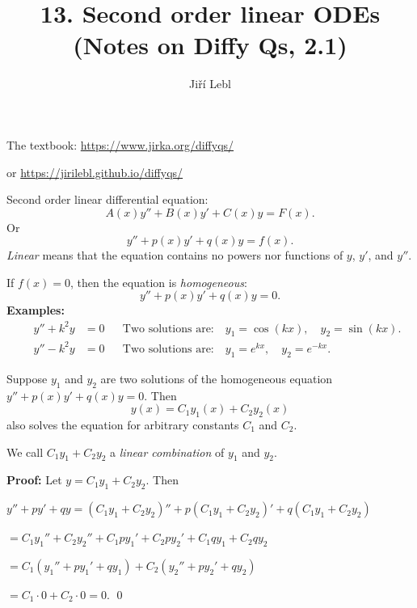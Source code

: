 \documentclass[10pt,aspectratio=169]{beamer}
\author{Ji\v{r}\'i Lebl}
\institute[OSU]{%
Oklahoma State University%
}
\title{13. Second order linear ODEs\\(Notes on Diffy Qs, 2.1)}
\date{}
\begin{document}
\begin{frame}
\titlepage


\begin{center}
The textbook: \url{https://www.jirka.org/diffyqs/}

or \url{https://jirilebl.github.io/diffyqs/}
\end{center}
\end{frame}

\begin{frame}
Second order linear differential equation:
\[
A(x) y'' + B(x)y' + C(x)y = F(x) .
\]
\pause
Or
\[
y'' + p(x)y' + q(x)y = f(x) .
\]
\pause
\emph{Linear} means that the 
equation contains no powers nor
functions of $y$, $y'$, and $y''$.
\medskip
\pause

If $f(x)=0$, then the equation is \emph{homogeneous}:
\[
y'' + p(x)y' + q(x)y = 0 .
\]
\pause
\textbf{Examples:}
\begin{align*}
\qquad y'' + k^2 y & = 0 &
& \text{Two solutions are:} \quad y_1 = \cos (kx), \quad y_2 = \sin(kx) . \qquad \\
\qquad y'' - k^2 y & = 0 &
& \text{Two solutions are:} \quad y_1 = e^{kx}, \quad y_2 = e^{-kx} . \qquad
\end{align*}
\end{frame}

\begin{frame}
\begin{theorem}[Superposition]
Suppose $y_1$ and $y_2$ are two solutions of the
homogeneous equation
$y'' + p(x)y' + q(x)y = 0$.
\pause
Then 
\[
y(x) = C_1 y_1(x) + C_2 y_2(x)
\]
also solves the equation for arbitrary constants $C_1$ and $C_2$.
\end{theorem}
\pause

We call $C_1 y_1 + C_2 y_2$ a \emph{linear combination} of $y_1$ and $y_2$.

\medskip
\pause

\textbf{Proof:}
Let 
$y = C_1 y_1 + C_2 y_2$.  \pause Then

\medskip
$y'' + py' + qy  = (C_1 y_1 + C_2 y_2)'' + p(C_1 y_1 + C_2 y_2)' + q(C_1 y_1
+ C_2 y_2)$

\pause
\phantom{$y'' + py' + qy$}%
${} = C_1 y_1'' + C_2 y_2'' + C_1 p y_1' + C_2 p y_2' + C_1 q y_1 + C_2 q y_2$

\pause
\phantom{$y'' + py' + qy$}%
${} = C_1 ( y_1'' + p y_1' + q y_1 ) + C_2 ( y_2'' + p y_2' + q y_2 )$

\pause
\phantom{$y'' + py' + qy$}%
${} = C_1 \cdot 0 + C_2 \cdot 0 = 0$. \qed

\end{frame}
\end{document}
